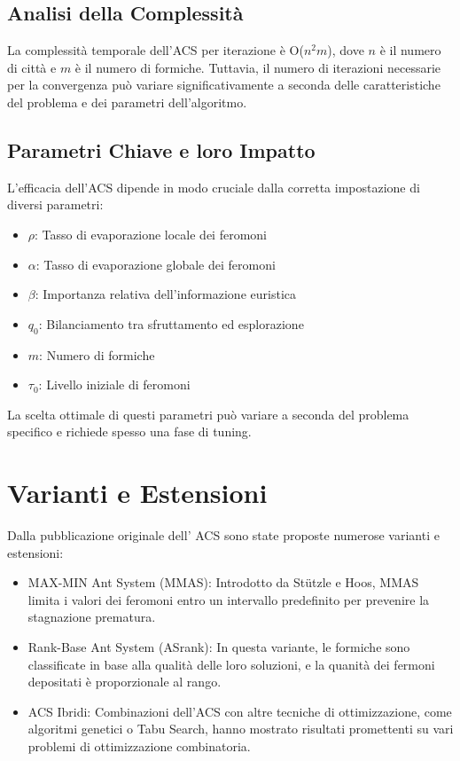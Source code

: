 \subsection{Analisi della Complessità}
La complessità temporale dell'\Gls{ACS} per iterazione è O($n^2m$), dove $n$ è il numero di città e $m$ è il numero di formiche. Tuttavia, il numero di iterazioni necessarie per la convergenza può variare significativamente a seconda delle caratteristiche del problema e dei parametri dell'algoritmo.

\subsection{Parametri Chiave e loro Impatto}
L'efficacia dell'\Gls{ACS} dipende in modo cruciale dalla corretta impostazione di diversi parametri:

\begin{itemize}
	\item $\rho$: Tasso di evaporazione locale dei feromoni
	\item $\alpha$: Tasso di evaporazione globale dei feromoni
	\item $\beta$: Importanza relativa dell'informazione euristica
	\item $q_0$: Bilanciamento tra sfruttamento ed esplorazione
	\item $m$: Numero di formiche
	\item $\tau_0$: Livello iniziale di feromoni
\end{itemize}

La scelta ottimale di questi parametri può variare a seconda del problema specifico e richiede spesso una fase di tuning.

\section{Varianti e Estensioni}

Dalla pubblicazione originale dell' \Gls{ACS} sono state proposte numerose varianti e estensioni:
\begin{itemize}
	\item MAX-MIN Ant System (\Gls{MMAS}): Introdotto da Stützle e Hoos, \Gls{MMAS} limita i valori dei feromoni entro un intervallo predefinito per prevenire la stagnazione prematura. \cite{Stuetzle1997}
	\item Rank-Base Ant System (\Gls{ASrank}): In questa variante, le formiche sono classificate in base alla qualità delle loro soluzioni, e la quanità dei fermoni depositati è proporzionale al rango.
	\item ACS Ibridi: Combinazioni dell'ACS con altre tecniche di ottimizzazione, come algoritmi genetici o Tabu Search, hanno mostrato risultati promettenti su vari problemi di ottimizzazione combinatoria.
\end{itemize}

